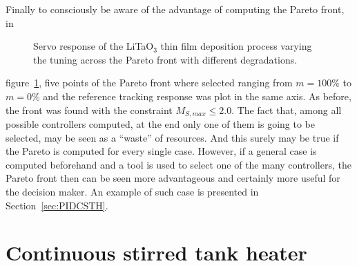 Finally to consciously be aware of the advantage of computing the Pareto front, in %
%
\begin{figure}[tb]
	\centering
	\caption{Servo response of the LiTaO$_3$ thin film deposition process varying the tuning across the Pareto front with different degradations.}
	\label{fig:LitaServoParetoResp}
\end{figure}
%
figure~\ref{fig:LitaServoParetoResp}, five points of the Pareto front where selected ranging from $m=100\%$ to $m=0\%$ and the reference tracking response was plot in the same axis. As before, the front was found with the constraint $M_{S,max}\leq 2.0$. The fact that, among all possible controllers computed, at the end only one of them is going to be selected, may  be seen as a ``waste'' of resources. And this surely may be true if the Pareto is computed for every single case. However, if a general case is computed beforehand and a tool is used to select one of the many controllers, the Pareto front then can be seen more advantageous and certainly more useful for the decision maker. An example of such case is presented in Section~\ref{sec:PIDCSTH}. 
%
\section{Continuous stirred tank heater}
\label{sec:CSTH}
%
